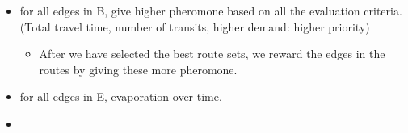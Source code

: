 \begin{itemize}
\begin{itemize}
\end{itemize}
\item for all edges in B, give higher pheromone based on all the evaluation criteria. (Total travel time, number of transits, higher demand: higher priority)
\begin{itemize}
\item After we have selected the best route sets, we reward the edges in the routes by giving these more pheromone.
\end{itemize}
\item for all edges in E, evaporation over time. 
\item 
\end{itemize}


